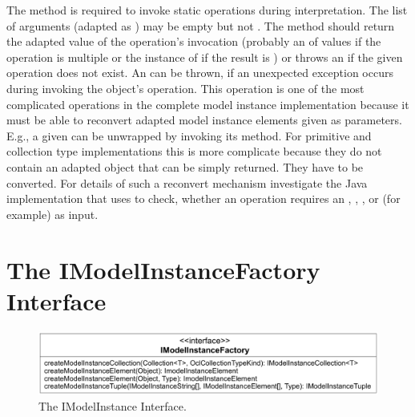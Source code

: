 The method  is required to invoke static operations during interpretation. The list of arguments (adapted as ) may be empty but not . The method should return the adapted value of the operation's invocation (probably an  of values if the operation is multiple or the instance of  if the result is ) or throws an  if the given operation does not exist. An  can be thrown, if an unexpected exception occurs during invoking the object's operation. This operation is one of the most complicated operations in the complete model instance implementation because it must be able to reconvert adapted model instance elements given as parameters. E.g., a given  can be unwrapped by invoking its  method. For primitive and collection type implementations this is more complicate because they do not contain an adapted object that can be simply returned. They have to be converted. For details of such a reconvert mechanism investigate the Java implementation that uses  to check, whether an operation requires an , , , or  (for example) as input.



\section{The IModelInstanceFactory Interface}

\begin{figure}
	\centering
	\includegraphics[width=1.0\linewidth]{figures/modelInstanceTypeAdaptation/modelInstanceFactoryInterface}
	\caption{The IModelInstance Interface.}
	\label{pic:modelInstanceTypeAdaptation:modelInstanceFactoryInterface}
\end{figure}

